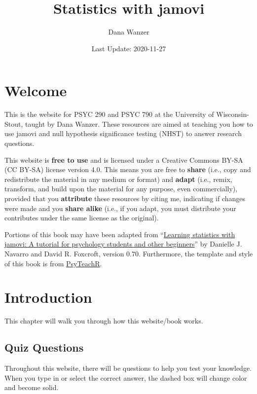 \documentclass[
]{book}
\title{Statistics with jamovi}
\author{Dana Wanzer}
\date{Last Update: 2020-11-27}
\begin{document}
\maketitle

{
\setcounter{tocdepth}{1}
\tableofcontents
}
\hypertarget{welcome}{%
\chapter*{Welcome}\label{welcome}}

This is the website for PSYC 290 and PSYC 790 at the University of Wisconsin-Stout, taught by Dana Wanzer. These resources are aimed at teaching you how to use jamovi and null hypothesis significance testing (NHST) to answer research questions.

This website is \textbf{free to use} and is licensed under a Creative Commons BY-SA (CC BY-SA) license version 4.0. This means you are free to \textbf{share} (i.e., copy and redistribute the material in any medium or format) and \textbf{adapt} (i.e., remix, transform, and build upon the material for any purpose, even commercially), provided that you \textbf{attribute} these resources by citing me, indicating if changes were made and you \textbf{share alike} (i.e., if you adapt, you must distribute your contributes under the same license as the original).

Portions of this book may have been adapted from ``\href{http://www.learnstatswithjamovi.com}{Learning statistics with jamovi: A tutorial for psychology students and other beginners}'' by Danielle J. Navarro and David R. Foxcroft, version 0.70. Furthermore, the template and style of this book is from \href{https://psyteachr.github.io/book-template/setup.html}{PsyTeachR}.

\hypertarget{introduction}{%
\chapter{Introduction}\label{introduction}}

This chapter will walk you through how this website/book works.

\hypertarget{quiz-questions}{%
\section{Quiz Questions}\label{quiz-questions}}

Throughout this website, there will be questions to help you test your knowledge. When you type in or select the correct answer, the dashed box will change color and become solid.
\end{document}
